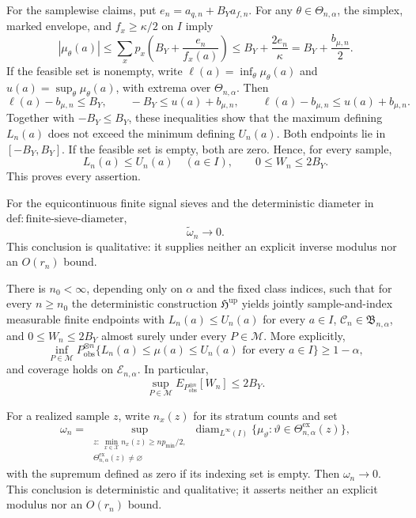 For the samplewise claims, put \(e_n=a_{q,n}+B_Ya_{f,n}\). For any \(\theta\in\Theta_{n,\alpha}\), the simplex, marked envelope, and \(f_x\ge\kappa/2\) on \(I\) imply
\[
 |\mu_\theta(a)|
 \le\sum_xp_x\left(B_Y+\frac{e_n}{f_x(a)}\right)
 \le B_Y+\frac{2e_n}{\kappa}=B_Y+\frac{b_{\mu,n}}2.
\]
If the feasible set is nonempty, write \(\ell(a)=\inf_\theta\mu_\theta(a)\) and \(u(a)=\sup_\theta\mu_\theta(a)\), with extrema over \(\Theta_{n,\alpha}\). Then
\[
 \ell(a)-b_{\mu,n}\le B_Y,
 \qquad -B_Y\le u(a)+b_{\mu,n},
 \qquad \ell(a)-b_{\mu,n}\le u(a)+b_{\mu,n}.
\]
Together with \(-B_Y\le B_Y\), these inequalities show that the maximum defining \(L_n(a)\) does not exceed the minimum defining \(U_n(a)\). Both endpoints lie in \([-B_Y,B_Y]\). If the feasible set is empty, both are zero. Hence, for every sample,
\[
 L_n(a)\le U_n(a)\quad(a\in I),
 \qquad0\le W_n\le2B_Y.
\]
This proves every assertion.

For the equicontinuous finite signal sieves and the deterministic diameter in \(\mathrm{def{:}finite\text{-}sieve\text{-}diameter}\),
\[
 \widetilde\omega_n\longrightarrow0.
\]
This conclusion is qualitative: it supplies neither an explicit inverse modulus nor an \(O(r_n)\) bound.

There is \(n_0<\infty\), depending only on \(\alpha\) and the fixed class indices, such that for every \(n\ge n_0\) the deterministic construction \(\mathfrak H^{\mathrm{up}}\) yields jointly sample-and-index measurable finite endpoints with \(L_n(a)\le U_n(a)\) for every \(a\in I\), \(\mathcal C_n\in\mathfrak B_{n,\alpha}\), and \(0\le W_n\le2B_Y\) almost surely under every \(P\in\mathcal M\). More explicitly,
\[
 \inf_{P\in\mathcal M}P_{\mathrm{obs}}^{\otimes n}
 \{L_n(a)\le\mu(a)\le U_n(a)\text{ for every }a\in I\}\ge1-\alpha,
\]
and coverage holds on \(\mathcal E_{n,\alpha}\). In particular,
\[
 \sup_{P\in\mathcal M}E_{P_{\mathrm{obs}}^{\otimes n}}[W_n]\le2B_Y.
\]

For a realized sample \(z\), write \(n_x(z)\) for its stratum counts and set
\[
 \omega_n=
 \sup_{\substack{z:\ \min_{x\in\mathcal X}n_x(z)\ge np_{\min}/2,\\
                  \Theta^{\mathrm{ex}}_{n,\alpha}(z)\ne\varnothing}}
 \operatorname{diam}_{L^\infty(I)}
 \{\mu_\vartheta:\vartheta\in\Theta^{\mathrm{ex}}_{n,\alpha}(z)\},
\]
with the supremum defined as zero if its indexing set is empty. Then \(\omega_n\to0\). This conclusion is deterministic and qualitative; it asserts neither an explicit modulus nor an \(O(r_n)\) bound.

